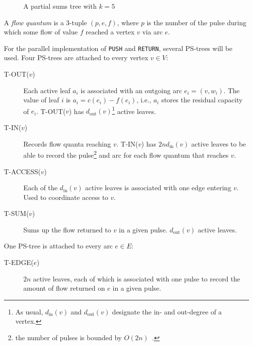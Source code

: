 \documentclass[a4paper,10pt, twocolumn]{article}
\begin{document}
\begin{figure}[H]
\begin{center}
\end{center}
\caption{A partial sums tree with $k=5$}
\label{fig:pstree}
\end{figure}

A \emph{flow quantum} is a 3-tuple $(p, e, f)$, where $p$ is the number of the pulse during which some flow of value $f$ reached a vertex $v$ via arc $e$.

For the parallel implementation of \lstinline|PUSH| and \lstinline|RETURN|, several PS-trees will be used. Four PS-trees are attached to every vertex $v \in V$:
\begin{description}
	\item [T-OUT($v$)] Each active leaf $a_i$ is associated with an outgoing arc $e_i = (v, w_i)$. The value of leaf $i$ is $a_i = c(e_i) - f(e_i)$, i.e., $a_i$ stores the residual capacity of $e_i$. T-OUT($v$) has $d_{\mathrm{out}}(v)$\footnote{As usual, $d_{\mathrm{in}}(v)$ and $d_{\mathrm{out}}(v)$ designate the in- and out-degree of a vertex.} active leaves.
	\item [T-IN($v$)] Records flow quanta reaching $v$. T-IN($v$) has $2nd_{\mathrm{in}}(v)$ active leaves to be able to record the pulse\footnote{the number of pulses is bounded by $O(2n)$~\cite{yossi81}.} and arc for each flow quantum that reaches $v$. 
	\item [T-ACCESS($v$)] Each of the $d_{\mathrm{in}}(v)$ active leaves is associated with one edge entering $v$. Used to coordinate access to $v$.
	\item [T-SUM($v$)] Sums up the flow returned to $v$ in a given pulse. $d_{\mathrm{out}}(v)$ active leaves. 
\end{description}
One PS-tree is attached to every arc $e \in E$:
\begin{description}
	\item [T-EDGE($e$)] $2n$ active leaves, each of which is associated with one pulse to record the amount of flow returned on $e$ in a given pulse.
\end{description}
\end{document}
